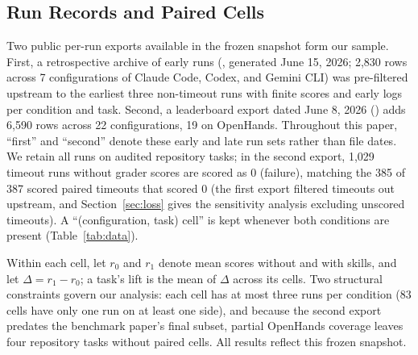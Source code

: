 \documentclass[10pt,conference]{IEEEtran}
\newif\ifkeepcuts \keepcutsfalse
\newcommand{\cut}[1]{\ifkeepcuts #1\fi}
\begin{document}
\subsection{Run Records and Paired Cells}
Two public per-run exports available in the frozen snapshot form our sample. First, a retrospective archive of early runs (, generated June 15, 2026; 2,830 rows across 7 configurations of Claude Code, Codex, and Gemini CLI) was pre-filtered upstream to the earliest three non-timeout runs with finite scores and early logs per condition and task. Second, a leaderboard export dated June 8, 2026 () adds 6,590 rows across 22 configurations, 19 on OpenHands. Throughout this paper, ``first'' and ``second'' denote these early and late run sets rather than file dates. We retain all runs on audited repository tasks; in the second export, 1,029 timeout runs without grader scores are scored as 0 (failure), matching the 385 of 387 scored paired timeouts that scored 0 (the first export filtered timeouts out upstream, and Section~\ref{sec:loss} gives the sensitivity analysis excluding unscored timeouts). A ``(configuration, task) cell'' is kept whenever both conditions are present (Table~\ref{tab:data}).

Within each cell, let $r_{0}$ and $r_{1}$ denote mean scores without and with skills, and let $\Delta=r_{1}-r_{0}$; a task's lift is the mean of $\Delta$ across its cells. Two structural constraints govern our analysis: each cell has at most three runs per condition (83 cells have only one run on at least one side), and because the second export predates the benchmark paper's final subset, partial OpenHands coverage leaves four repository tasks without paired cells. All results reflect this frozen snapshot\cut{; adding newer exports requires re-running normalisation, feature extraction, and input-hash registration}.
\end{document}
